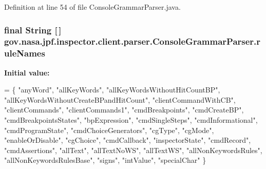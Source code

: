 Definition at line 54 of file Console\+Grammar\+Parser.\+java.

\subsubsection[{\texorpdfstring{rule\+Names}{ruleNames}}]{\setlength{\rightskip}{0pt plus 5cm}final String \mbox{[}$\,$\mbox{]} gov.\+nasa.\+jpf.\+inspector.\+client.\+parser.\+Console\+Grammar\+Parser.\+rule\+Names\hspace{0.3cm}{\ttfamily [static]}}\hypertarget{classgov_1_1nasa_1_1jpf_1_1inspector_1_1client_1_1parser_1_1_console_grammar_parser_ae1bd499757922a77269f2b423f9c7494}{}\label{classgov_1_1nasa_1_1jpf_1_1inspector_1_1client_1_1parser_1_1_console_grammar_parser_ae1bd499757922a77269f2b423f9c7494}
{\bfseries Initial value\+:}
\begin{DoxyCode}
= \{
    \textcolor{stringliteral}{"anyWord"}, \textcolor{stringliteral}{"allKeyWords"}, \textcolor{stringliteral}{"allKeyWordsWithoutHitCountBP"}, \textcolor{stringliteral}{"allKeyWordsWithoutCreateBPandHitCount"}, 
    \textcolor{stringliteral}{"clientCommandWithCB"}, \textcolor{stringliteral}{"clientCommands"}, \textcolor{stringliteral}{"clientCommands1"}, \textcolor{stringliteral}{"cmdBreakpoints"}, 
    \textcolor{stringliteral}{"cmdCreateBP"}, \textcolor{stringliteral}{"cmdBreakpointsStates"}, \textcolor{stringliteral}{"bpExpression"}, \textcolor{stringliteral}{"cmdSingleSteps"}, 
    \textcolor{stringliteral}{"cmdInformational"}, \textcolor{stringliteral}{"cmdProgramState"}, \textcolor{stringliteral}{"cmdChoiceGenerators"}, \textcolor{stringliteral}{"cgType"}, 
    \textcolor{stringliteral}{"cgMode"}, \textcolor{stringliteral}{"enableOrDisable"}, \textcolor{stringliteral}{"cgChoice"}, \textcolor{stringliteral}{"cmdCallback"}, \textcolor{stringliteral}{"inspectorState"}, 
    \textcolor{stringliteral}{"cmdRecord"}, \textcolor{stringliteral}{"cmdAssertions"}, \textcolor{stringliteral}{"allText"}, \textcolor{stringliteral}{"allTextNoWS"}, \textcolor{stringliteral}{"allTextWS"}, \textcolor{stringliteral}{"allNonKeywordsRules"}, 
    \textcolor{stringliteral}{"allNonKeywordsRulesBase"}, \textcolor{stringliteral}{"signs"}, \textcolor{stringliteral}{"intValue"}, \textcolor{stringliteral}{"specialChar"}
  \}
\end{DoxyCode}


